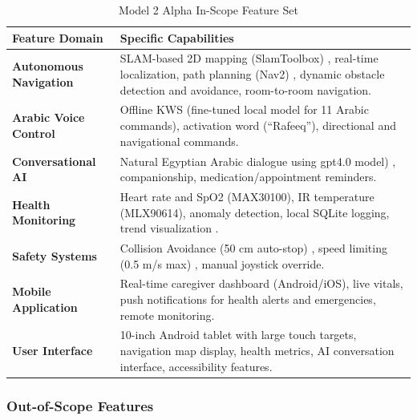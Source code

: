 \documentclass[12pt,a4paper]{report}
\renewcommand{\arraystretch}{1.45}
\renewcommand{\arraystretch}{1.3}
\begin{document}
\begin{table}[H]
\centering
\caption{Model 2 Alpha In-Scope Feature Set}
\label{tab:inscope}
{\renewcommand{\arraystretch}{1.5}
\begin{tabularx}{\textwidth}{@{}p{3.2cm}X@{}}
\toprule
\textbf{Feature Domain} & \textbf{Specific Capabilities} \\
\midrule
\textbf{Autonomous Navigation} &
SLAM-based 2D mapping (SlamToolbox) \cite{orbslam3}, real-time localization, path planning (Nav2) \cite{nav2}, dynamic obstacle detection and avoidance, room-to-room navigation. \\
\midrule
\textbf{Arabic Voice Control} & Offline KWS (fine-tuned local model for 11 Arabic commands), activation word (``Rafeeq''), directional and navigational commands. \\
\midrule
\textbf{Conversational AI} &
Natural Egyptian Arabic dialogue using gpt4.0 model) , companionship, medication/appointment reminders. \\
\midrule
\textbf{Health Monitoring} &
Heart rate and SpO2 (MAX30100), IR temperature (MLX90614), anomaly detection, local SQLite logging, trend visualization \cite{sonekar_2024}. \\
\midrule
\textbf{Safety Systems} &
Collision Avoidance (50 cm auto-stop) \cite{iso13482}, speed limiting (0.5 m/s max) \cite{iso7176_6}, manual joystick override. \\
\midrule
\textbf{Mobile Application} &
Real-time caregiver dashboard (Android/iOS), live vitals, push notifications for health alerts and emergencies, remote monitoring. \\
\midrule
\textbf{User Interface} &
10-inch Android tablet with large touch targets, navigation map display, health metrics, AI conversation interface, accessibility features. \\
\bottomrule
\end{tabularx}}
\end{table}

\subsubsection{Out-of-Scope Features}
\end{document}
